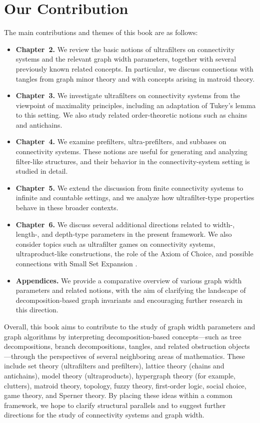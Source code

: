 \documentclass[10pt]{book}
\theoremstyle{definition}
\begin{document}
\section{Our Contribution}
The main contributions and themes of this book are as follows:
\begin{itemize}
    \item \textbf{Chapter~2.}
    We review the basic notions of ultrafilters on connectivity systems and the relevant graph width parameters, together with several previously known related concepts.
    In particular, we discuss connections with tangles from graph minor theory and with concepts arising in matroid theory.

    \item \textbf{Chapter~3.}
    We investigate ultrafilters on connectivity systems from the viewpoint of maximality principles, including an adaptation of Tukey's lemma to this setting.
    We also study related order-theoretic notions such as chains and antichains.

    \item \textbf{Chapter~4.}
    We examine prefilters, ultra-prefilters, and subbases on connectivity systems.
    These notions are useful for generating and analyzing filter-like structures, and their behavior in the connectivity-system setting is studied in detail.

    \item \textbf{Chapter~5.}
    We extend the discussion from finite connectivity systems to infinite and countable settings, and we analyze how ultrafilter-type properties behave in these broader contexts.

    \item \textbf{Chapter~6.}
    We discuss several additional directions related to width-, length-, and depth-type parameters in the present framework.
    We also consider topics such as ultrafilter games on connectivity systems, ultraproduct-like constructions, the role of the Axiom of Choice, and possible connections with Small Set Expansion \cite{303,304,305}.

    \item \textbf{Appendices.}
    We provide a comparative overview of various graph width parameters and related notions, with the aim of clarifying the landscape of decomposition-based graph invariants and encouraging further research in this direction.
\end{itemize}

Overall, this book aims to contribute to the study of graph width parameters and graph algorithms by interpreting decomposition-based concepts---such as tree decompositions, branch decompositions, tangles, and related obstruction objects---through the perspectives of several neighboring areas of mathematics.
These include set theory (ultrafilters and prefilters), lattice theory (chains and antichains), model theory (ultraproducts), hypergraph theory (for example, clutters), matroid theory, topology, fuzzy theory, first-order logic, social choice, game theory, and Sperner theory.
By placing these ideas within a common framework, we hope to clarify structural parallels and to suggest further directions for the study of connectivity systems and graph width.
\end{document}
